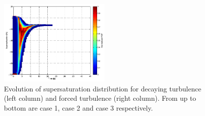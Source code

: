 \documentclass[12pt]{article}
\begin{document}
\begin{figure}[H]
\includegraphics[width=0.48\textwidth]{Figures/pdf_supersat_f3}
\caption{Evolution of supersaturation distribution for decaying turbulence (left column) and forced turbulence (right column). From up to bottom are case 1, case 2 and case 3 respectively.}\label{fig:supersat_distri}
\end{figure}




\end{document}
